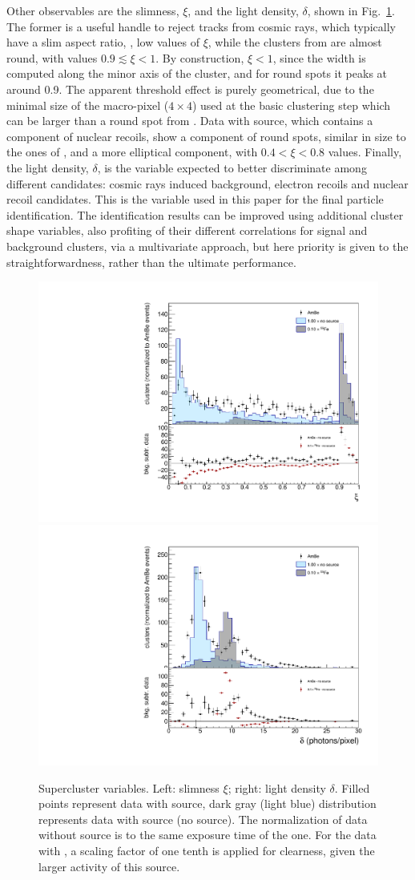 Other observables are the slimness, $\xi$, and the light density,
$\delta$, shown in Fig.~\ref{fig:clshape}. The former is a useful
handle to reject tracks from cosmic rays, which typically have a slim
aspect ratio, \ie, low values of $\xi$, while the clusters from \fe
are almost round, with values $0.9\lesssim\xi<1$. By construction,
$\xi<1$, since the width is computed along the minor axis of the
cluster, and for round spots it peaks at around 0.9. The apparent
threshold effect is purely geometrical, due to the minimal size of the
macro-pixel ($4{\times}4$) used at the basic clustering step which can
be larger than a round spot from \fe. Data with \ambe source, which
contains a component of nuclear recoils, show a component of round
spots, similar in size to the ones of \fe, and a more elliptical
component, with $0.4<\xi<0.8$ values. Finally, the light density,
$\delta$, is the variable expected to better discriminate among
different candidates: cosmic rays induced background, electron recoils
and nuclear recoil candidates. This is the variable used in this paper
for the final particle identification. The identification results can
be improved using additional cluster shape variables, also profiting
of their different correlations for signal and background clusters,
via a multivariate approach, but here priority is given to the
straightforwardness, rather than the ultimate performance.

\begin{figure}[ht]
  \begin{center}
  \includegraphics[width=0.45\linewidth]{figures/slimness}
  \includegraphics[width=0.45\linewidth]{figures/density}

  \caption{Supercluster variables. Left: slimness $\xi$; right: light
    density $\delta$. Filled points represent data with \ambe source,
    dark gray (light blue) distribution represents data with \fe
    source (no source).  The normalization of data without source is
    to the same exposure time of the \ambe one. For the data with \fe,
    a scaling factor of one tenth is applied for clearness, given the
    larger activity of this source. \label{fig:clshape}}

\end{center}
\end{figure}

